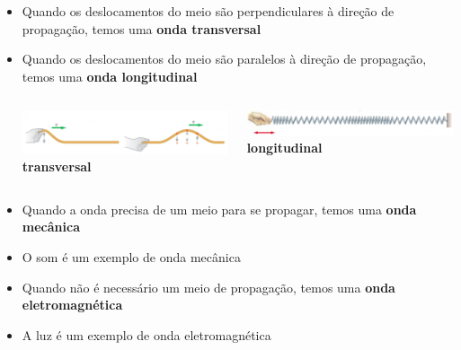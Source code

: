 \documentclass[t,%
brazilian,%
11pt,%
aspectratio=169,%
table%
]{beamer}
\begin{document}
\begin{frame}
    \begin{itemize}
        \item Quando os deslocamentos do meio são perpendiculares à direção de
            propagação, temos uma \textbf{onda transversal}
        \item Quando os deslocamentos do meio são paralelos à direção de
            propagação, temos uma \textbf{onda longitudinal}
            \vspace{\fill}
            \begin{columns}
                \begin{column}{0.4\textwidth}
                    \includegraphics[width=\textwidth]{images/transversal.png}
                    \centering \textbf{transversal}
                \end{column}

                \begin{column}{0.4\textwidth}
                    \includegraphics[width=\textwidth]{images/longitudinal.png}
                    \centering \textbf{longitudinal}
                \end{column}
            \end{columns}
        \item Quando a onda precisa de um meio para se propagar, temos uma \textbf{onda mecânica}
        \item O som é um exemplo de onda mecânica
        \item Quando não é necessário um meio de propagação, temos uma \textbf{onda eletromagnética}
        \item A luz é um exemplo de onda eletromagnética
    \end{itemize}
\end{frame}
\end{document}
